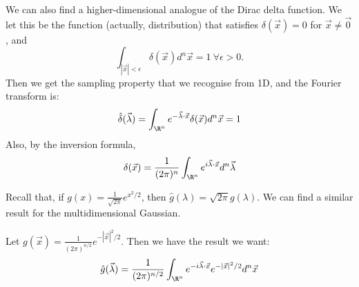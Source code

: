 \documentclass[../Main.tex]{subfiles}
\begin{document}
We can also find a higher-dimensional analogue of the Dirac delta function. We let this be the function (actually, distribution) that satisfies $\delta(\vec{x}) = 0$ for $\vec{x} \neq \vec{0}$, and
\begin{equation*}
    \int_{|\vec{x}| < \epsilon} \delta(\vec{x}) d^n \vec{x} = 1~\forall \epsilon > 0.
\end{equation*}
Then we get the sampling property that we recognise from 1D, and the Fourier transform is:
\begin{equation*}
    \hat{\delta}(\vec{\lambda}) = \int_{\R^n} e^{- \vec{\lambda} \cdot \vec{x}} \delta(\vec{x}) d^n \vec{x} = 1
\end{equation*}
Also, by the inversion formula,
\begin{equation*}
    \delta(\vec{x}) = \frac{1}{(2\pi)^n} \int_{\R^n} e^{i \vec{\lambda} \cdot \vec{x}} d^n \vec{\lambda}
\end{equation*}
\begin{example}
    Recall that, if $g(x) = \frac{1}{\sqrt{2\pi}} e^{x^2 / 2}$, then $\hat{g}(\lambda) = \sqrt{2\pi} g(\lambda)$. We can find a similar result for the multidimensional Gaussian.

    Let $g(\vec{x}) = \frac{1}{(2\pi)^{n / 2}} e^{-|\vec{x}|^2 / 2}$. Then we have the result we want:
    \begin{align*}
        \hat{g}(\vec{\lambda})&= \frac1{(2\pi)^{n / 2}} \int_{\R^n} e^{-i \vec{\lambda} \cdot \vec{x}} e^{-|\vec{x}|^2 / 2} d^n \vec{x}\\
    \end{align*}
\end{example}
\end{document}
